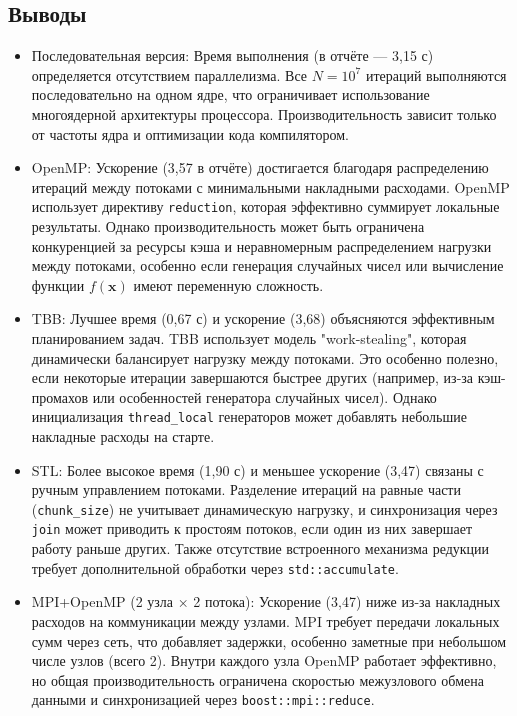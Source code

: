 \documentclass[12pt,a4paper]{extarticle}
\begin{document}
\subsection{Выводы}
\begin{itemize}
\item Последовательная версия: Время выполнения (в отчёте — 3,15 с) определяется отсутствием параллелизма. Все $N = 10^7$ итераций выполняются последовательно на одном ядре, что ограничивает использование многоядерной архитектуры процессора. Производительность зависит только от частоты ядра и оптимизации кода компилятором.
\item OpenMP: Ускорение (3,57 в отчёте) достигается благодаря распределению итераций между потоками с минимальными накладными расходами. OpenMP использует директиву \texttt{reduction}, которая эффективно суммирует локальные результаты. Однако производительность может быть ограничена конкуренцией за ресурсы кэша и неравномерным распределением нагрузки между потоками, особенно если генерация случайных чисел или вычисление функции $f(\mathbf{x})$ имеют переменную сложность.
\item TBB: Лучшее время (0,67 с) и ускорение (3,68) объясняются эффективным планированием задач. TBB использует модель "work-stealing", которая динамически балансирует нагрузку между потоками. Это особенно полезно, если некоторые итерации завершаются быстрее других (например, из-за кэш-промахов или особенностей генератора случайных чисел). Однако инициализация \texttt{thread\_local} генераторов может добавлять небольшие накладные расходы на старте.
\item STL: Более высокое время (1,90 с) и меньшее ускорение (3,47) связаны с ручным управлением потоками. Разделение итераций на равные части (\texttt{chunk\_size}) не учитывает динамическую нагрузку, и синхронизация через \texttt{join} может приводить к простоям потоков, если один из них завершает работу раньше других. Также отсутствие встроенного механизма редукции требует дополнительной обработки через \texttt{std::accumulate}.
\item MPI+OpenMP (2 узла × 2 потока): Ускорение (3,47) ниже из-за накладных расходов на коммуникации между узлами. MPI требует передачи локальных сумм через сеть, что добавляет задержки, особенно заметные при небольшом числе узлов (всего 2). Внутри каждого узла OpenMP работает эффективно, но общая производительность ограничена скоростью межузлового обмена данными и синхронизацией через \texttt{boost::mpi::reduce}.
\end{itemize}
\end{document}
